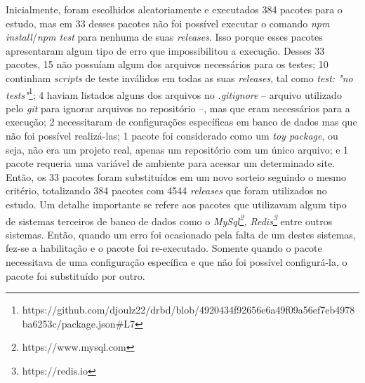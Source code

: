 Inicialmente, foram escolhidos aleatoriamente e executados 384 pacotes para o estudo, mas em 33 desses pacotes não foi possível executar o comando \textit{npm install}/\textit{npm test} para nenhuma de suas \textit{releases}. Isso porque esses pacotes apresentaram algum tipo de erro que impossibilitou a execução. Desses 33 pacotes, 15 não possuíam algum dos arquivos necessários para os testes; 10 continham \textit{scripts} de teste inválidos em todas as suas \textit{releases}, tal como \textit{test: "no tests"}\footnote{https://github.com/djoulz22/drbd/blob/4920434f92656e6a49f09a56ef7eb4978ba6253c/package.json\#L7}; 4 haviam listados alguns dos arquivos no \textit{.gitignore} -- arquivo utilizado pelo \textit{git} para ignorar arquivos no repositório --, mas que eram necessários para a execução; 2 necessitaram de configurações específicas em banco de dados mas que não foi possível realizá-las; 1 pacote foi considerado como um \textit{toy package}, ou seja, não era um projeto real, apenas um repositório com um único arquivo; e 1 pacote requeria uma variável de ambiente para acessar um determinado site. Então, os 33 pacotes foram substituídos em um novo sorteio seguindo o mesmo critério, totalizando 384 pacotes com 4544 \textit{releases} que foram utilizados no estudo. Um detalhe importante se refere aos pacotes que utilizavam algum tipo de sistemas terceiros de banco de dados como o \textit{MySql\footnote{https://www.mysql.com}, Redis\footnote{https://redis.io}} entre outros sistemas. Então, quando um erro foi ocasionado pela falta de um destes sistemas, fez-se a habilitação e o pacote foi re-executado. Somente quando o pacote necessitava de uma configuração específica e que não foi possível configurá-la, o pacote foi substituído por outro.

